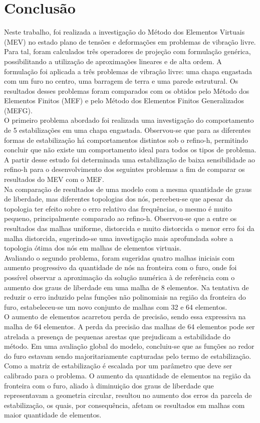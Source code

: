 \chapter{Conclusão}

\indent Neste trabalho, foi realizada a investigação do Método dos Elementos Virtuais (MEV) no estado plano de tensões e deformações em problemas de vibração livre. Para tal, foram calculados três operadores de projeção com formulação genérica, possibilitando a utilização de aproximações lineares e de alta ordem. A formulação foi aplicada a três problemas de vibração livre: uma chapa engastada com um furo no centro, uma barragem de terra e uma parede estrutural. Os resultados desses problemas foram comparados com os obtidos pelo Método dos Elementos Finitos (MEF) e pelo Método dos Elementos Finitos Generalizados (MEFG).\\
\indent O primeiro problema abordado foi realizada uma investigação do comportamento de 5 estabilizações em uma chapa engastada. Observou-se que para as diferentes formas de estabilização há comportamentos distintos sob o refino-h, permitindo concluir que não existe um comportamento ideal para todos os tipos de problema. A partir desse estudo foi determinada uma estabilização de baixa sensibilidade ao refino-h para o desenvolvimento dos seguintes problemas a fim de comparar os resultados do MEV com o MEF.\\
\indent Na comparação de resultados de uma modelo com a mesma quantidade de graus de liberdade, mas diferentes topologias dos nós, percebeu-se que  apesar da topologia ter efeito sobre o erro relativo das frequências, o mesmo é muito pequeno, principalmente comparado ao refino-h. Observou-se que a entre os resultados das malhas uniforme, distorcida e muito distorcida o menor erro foi da malha distorcida, sugerindo-se uma investigação mais aprofundada sobre a topologia ótima dos nós em malhas de elementos virtuais.\\
\indent Avaliando o segundo problema, foram sugeridas quatro malhas iniciais com aumento progressivo da quantidade de nós na fronteira com o furo, onde foi possível observar a aproximação da solução numérica à de referência com o aumento dos graus de liberdade em uma malha de 8 elementos. Na tentativa de reduzir o erro induzido pelas funções não polinomiais na região da fronteira do furo, estabeleceu-se um novo conjunto de malhas com 32 e 64 elementos.\\
\indent O aumento de elementos acarretou perda de precisão, sendo essa expressiva na malha de 64 elementos. A perda da precisão das malhas de 64 elementos pode ser atrelada a presença de pequenas arestas que prejudicam a estabilidade do método. Em uma avaliação global do modelo, concluiu-se que as funções ao redor do furo estavam sendo majoritariamente capturadas pelo termo de estabilização. Como a matriz de estabilização é escalada por um parâmetro que deve ser calibrado para o problema. O aumento da quantidade de elementos na região da fronteira com o furo, aliado à diminuição dos graus de liberdade que representavam a geometria circular, resultou no aumento dos erros da parcela de estabilização, os quais, por consequência, afetam os resultados em malhas com maior quantidade de elementos.\\
